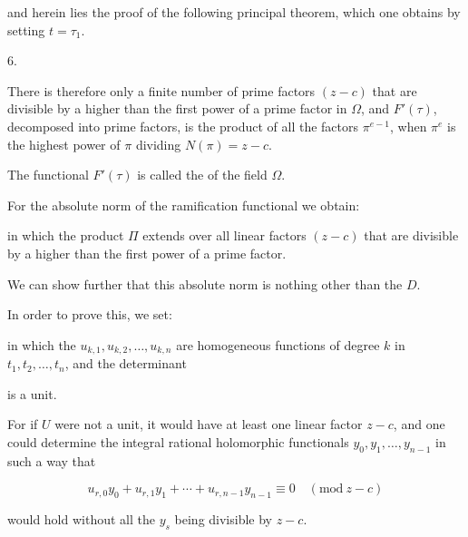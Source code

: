 
and herein lies the proof of the following principal theorem, which
one obtains by setting $t = \tau_1$.

6. 

There is therefore only a finite number of prime factors $(z-c)$ that
are divisible by a higher than the first power of a prime factor in
$\Omega$, and $F'(\tau)$, decomposed into prime factors, is the
product of all the factors $\pi^{e-1}$, when $\pi^e$ is the highest
power of $\pi$ dividing $N(\pi) = z - c$.

The functional $F'(\tau)$ is called the  of the
field $\Omega$.

For the absolute norm of the ramification functional we obtain:


in which the product $\Pi$ extends over all linear factors $(z-c)$
that are divisible by a higher than the first power of a prime
factor.

We can show further that this absolute norm is nothing other than the
 $D$.

In order to prove this, we set:


in which the $u_{k,1}, u_{k,2}, \ldots, u_{k,n}$ are homogeneous
functions of degree $k$ in $t_1, t_2, \ldots, t_n$, and the
determinant


is a unit.

For if $U$ were not a unit, it would have at least one linear factor
$z-c$, and one could determine the integral rational holomorphic
functionals $y_0, y_1, \ldots, y_{n-1}$ in such a way that

\[ u_{r,0}y_0 + u_{r,1}y_1 + \cdots + u_{r,n-1}y_{n-1} \equiv 0 \quad (\mathrm{mod}\ z-c) \]

would hold without all the $y_s$ being divisible by $z-c$.
